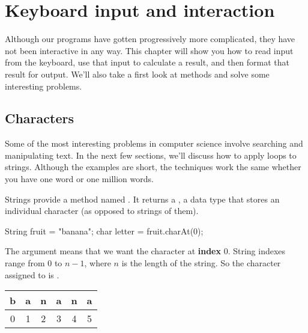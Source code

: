 \chapter{Keyboard input and interaction}

Although our programs have gotten progressively more complicated, they have not been interactive in any way. This chapter will show you how to read input from the keyboard, use that input to calculate a result, and then format that result for output. We'll also take a first look at  methods and solve some interesting problems.



\section{Characters}

Some of the most interesting problems in computer science involve searching and manipulating text.
In the next few sections, we'll discuss how to apply loops to strings.
Although the examples are short, the techniques work the same whether you have one word or one million words.


Strings provide a method named .
It returns a , a data type that stores an individual character (as opposed to strings of them).

\begin{code}
	String fruit = "banana";
	char letter = fruit.charAt(0);
\end{code}

The argument  means that we want the character at {\bf index} 0.
String indexes range from 0 to $n-1$, where $n$ is the length of the string.
So the character assigned to  is .

\begin{center}
	\ttfamily
	\begin{tabular}{cccccc}
		\hline
		\multicolumn{1}{|l|}{b} & \multicolumn{1}{l|}{a} & \multicolumn{1}{l|}{n} & \multicolumn{1}{l|}{a} & \multicolumn{1}{l|}{n} & \multicolumn{1}{l|}{a} \\ \hline
		0                       & 1                      & 2                      & 3                      & 4                      & 5
	\end{tabular}
\end{center}


